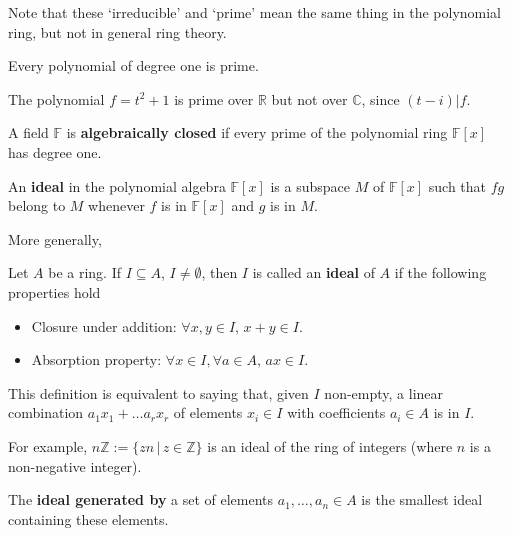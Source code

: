 Note that these `irreducible' and `prime' mean the same thing in the polynomial ring, but not in general ring theory.

\begin{remark}
	Every polynomial of degree one is prime.
\end{remark}

\begin{example}
	The polynomial $f = t^2 + 1$ is prime over $\mathbb{R}$ but not over $\mathbb{C}$, since $(t-i) | f$.
\end{example}

\begin{definition}
	A field $\mathbb{F}$ is \textbf{algebraically closed} if every prime of the polynomial ring $\mathbb{F}[x]$ has degree one.
\end{definition}

\begin{definition}\label{def:ideal}
	An \textbf{ideal} in the polynomial algebra $\mathbb{F}[x]$ is a subspace $M$ of $\mathbb{F}[x]$ such that $fg$ belong to $M$ whenever $f$ is in $\mathbb{F}[x]$ and $g$ is in $M$.
\end{definition}

More generally,

\begin{definition}[Ideal]
	Let $A$ be a ring. If \(I \subseteq A\), $I \neq \emptyset$, then \(I\) is called an \textbf{ideal} of \(A\) if the following properties hold
	\begin{itemize}
	\item
	  Closure under addition: \(\forall x, y \in I, \, x+y \in I\).
	\item
	  Absorption property: \(\forall x \in I, \forall a \in A, \, ax \in I\).
	\end{itemize}
\end{definition}
	
This definition is equivalent to saying that, given $I$ non-empty, a linear combination $a_1x_1 + \ldots a_rx_r$ of elements $x_i \in I$ with coefficients $a_i \in A$ is in $I$.

For example, \(n \mathbb{Z} := \{zn \, | \, z \in \mathbb{Z} \}\) is an ideal of the ring of integers (where \(n\) is a non-negative integer).

\begin{definition}
	The \textbf{ideal generated by} a set of elements $a_1, \ldots, a_n \in A$ is the smallest ideal containing these elements.
\end{definition}

